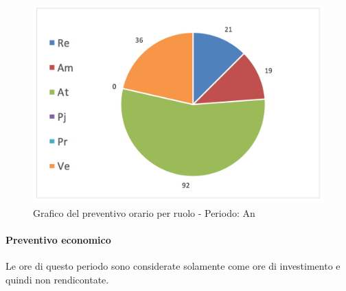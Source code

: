 			\begin{figure}[H]
			\centering
			\includegraphics[scale=0.30]{img/h_r_An}
			\caption{Grafico del preventivo orario per ruolo - Periodo: An}
			\label{fig:h_r_An"}
			\end{figure}

		\newpage
			\paragraph{Preventivo economico}
		Le ore di questo periodo sono considerate solamente come ore di investimento e quindi non rendicontate.\\


